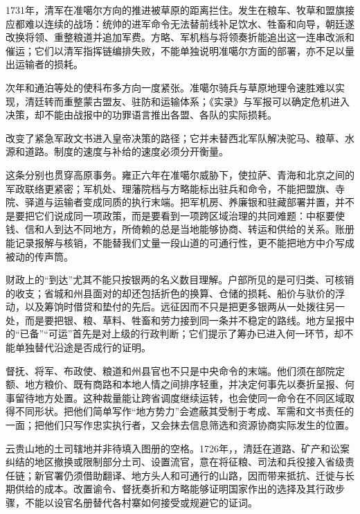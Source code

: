1731年，清军在准噶尔方向的推进被草原的距离拦住。发生在粮车、牧草和盟旗接应都难以连续的战场：统帅的进军命令无法替前线补足饮水、牲畜和向导，朝廷遂改换将领、重整粮道并追加军费。方略、军机档与将领奏折能追出这一连串改派和催运；它们以清军指挥链编排失败，不能单独说明准噶尔方面的部署，亦不足以量出运输者的损耗。

次年和通泊等处的使科布多方向一度紧张。准噶尔骑兵与草原地理令速胜难以实现，清廷转而重整蒙古盟友、驻防和运输体系；《实录》与军报可以确定危机进入决策，却不能由战报中的功罪语言推出各盟、各队的实际损耗。

\begin{turningpoint}
改变了紧急军政文书进入皇帝决策的路径；它并未替西北军队解决驼马、粮草、水源和道路。制度的速度与补给的速度必须分开衡量。
\end{turningpoint}

这条分别也贯穿高原事务。雍正六年在准噶尔威胁下，使拉萨、青海和北京之间的军政联络更紧密；军机处、理藩院档与方略能标出驻兵和命令，不能把盟旗、寺院、驿道与运输者变成同质的执行末端。把军机房、养廉银和驻藏部署并置，并不是要把它们说成同一项政策，而是要看到一项跨区域治理的共同难题：中枢要使钱、信和人到达不同地方，所倚赖的总是当地能够协商、转运和供给的关系。账册能记录报解与核销，不能替我们丈量一段山道的可通行性，更不能把地方中介写成被动的传声筒。

财政上的“到达”尤其不能只按银两的名义数目理解。户部所见的是可归类、可核销的收支；省城和州县面对的却还包括折色的换算、仓储的损耗、船价与驮价的浮动，以及筹饷时借贷和垫付的先后。远征因而不只是把更多银两从一处拨往另一处，而是要把银、粮、草料、牲畜和劳力接到同一条并不稳定的路线。地方呈报中的“已备”“可运”首先是对上级的行政判断；它们提示了筹办已进入何一环节，却不能单独替代沿途是否成行的证明。

督抚、将军、布政使、粮道和州县官也不只是中央命令的末端。他们须在部院定额、地方粮价、既有商路和本地人情之间排序轻重，并决定何事先以奏折呈报、何事留待地方处置。这种裁量能让跨省调度继续运转，也会使同一命令在不同区域取得不同形状。把他们简单写作“地方势力”会遮蔽其受制于考成、军需和文书责任的一面；把他们只写作忠实执行者，又会抹去信息筛选和资源协商实际发生的位置。

云贵山地的土司辖地并非待填入图册的空格。1726年，，清廷在道路、矿产和讼案纠结的地区撤换或限制部分土司、设置流官，意在将征粮、司法和兵役接入省级责任链；新官署仍须借助翻译、地方头人和可通行的山路，因而带来抵抗、迁徙与长期供给的成本。改置谕令、督抚奏折和方略能够证明国家作出的选择及其行政步骤，不能以设官名册替代各村寨如何接受或规避它的证词。

